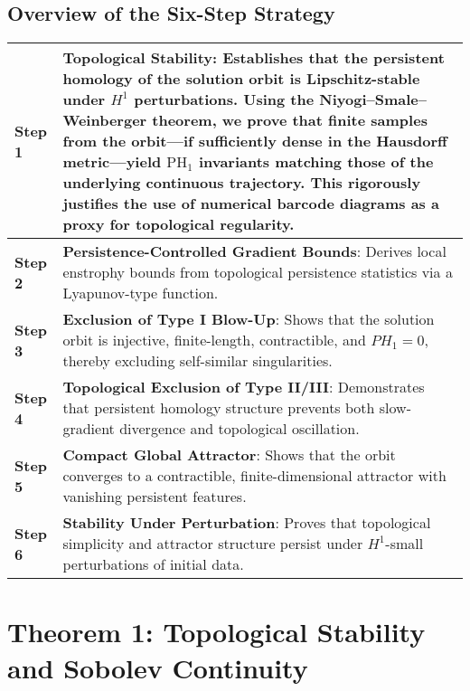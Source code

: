 \documentclass[11pt]{article}
\theoremstyle{definition}
\begin{document}
\subsection*{Overview of the Six-Step Strategy}

\begin{center}
\renewcommand{\arraystretch}{1.3}
\begin{tabular}{|p{1.8cm}|p{12cm}|}
\hline
\textbf{Step 1} & \textbf{Topological Stability}: Establishes that the persistent homology of the solution orbit is Lipschitz-stable under $H^1$ perturbations. Using the Niyogi--Smale--Weinberger theorem, we prove that finite samples from the orbit—if sufficiently dense in the Hausdorff metric—yield $\mathrm{PH}_1$ invariants matching those of the underlying continuous trajectory. This rigorously justifies the use of numerical barcode diagrams as a proxy for topological regularity. \\
\hline
\textbf{Step 2} & \textbf{Persistence-Controlled Gradient Bounds}: Derives local enstrophy bounds from topological persistence statistics via a Lyapunov-type function. \\
\hline
\textbf{Step 3} & \textbf{Exclusion of Type I Blow-Up}: Shows that the solution orbit is injective, finite-length, contractible, and $PH_1 = 0$, thereby excluding self-similar singularities. \\
\hline
\textbf{Step 4} & \textbf{Topological Exclusion of Type II/III}: Demonstrates that persistent homology structure prevents both slow-gradient divergence and topological oscillation. \\
\hline
\textbf{Step 5} & \textbf{Compact Global Attractor}: Shows that the orbit converges to a contractible, finite-dimensional attractor with vanishing persistent features. \\
\hline
\textbf{Step 6} & \textbf{Stability Under Perturbation}: Proves that topological simplicity and attractor structure persist under $H^1$-small perturbations of initial data. \\
\hline
\end{tabular}
\end{center}


\section{Theorem 1: Topological Stability and Sobolev Continuity}
\end{document}
